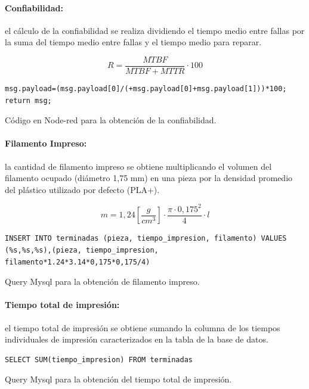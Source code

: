 \paragraph{Confiabilidad:} el cálculo de la confiabilidad se realiza dividiendo el tiempo medio entre fallas por la suma del tiempo medio entre fallas y el tiempo medio para reparar.

\begin{equation}
R=\frac{MTBF}{MTBF+MTTR}\cdot 100
\end{equation}

\begin{table}[H]
\begin{lstlisting}
msg.payload=(msg.payload[0]/(+msg.payload[0]+msg.payload[1]))*100;
return msg;
\end{lstlisting}
\caption{Código en Node-red para la obtención de la confiabilidad.}
\end{table}

\paragraph{Filamento Impreso:} la cantidad de filamento impreso se obtiene multiplicando el volumen del filamento ocupado (diámetro 1,75 mm) en una pieza por la densidad promedio del plástico utilizado por defecto (PLA+).

\begin{equation}
m=1,24\left[\frac{g}{cm^3}\right] \cdot \frac{\pi \cdot 0,175^2}{4} \cdot l
\end{equation}

\begin{table}[H]
\begin{lstlisting}
INSERT INTO terminadas (pieza, tiempo_impresion, filamento) VALUES (%s,%s,%s),(pieza, tiempo_impresion, filamento*1.24*3.14*0,175*0,175/4)
\end{lstlisting}
\caption{Query Mysql para la obtención de filamento impreso.}
\end{table}


\paragraph{Tiempo total de impresión:} el tiempo total de impresión se obtiene sumando la columna de los tiempos individuales de impresión caracterizados en la tabla de la base de datos.

\begin{table}[H]
\begin{lstlisting}
SELECT SUM(tiempo_impresion) FROM terminadas
\end{lstlisting}
\caption{Query Mysql para la obtención del tiempo total de impresión.}
\end{table}


